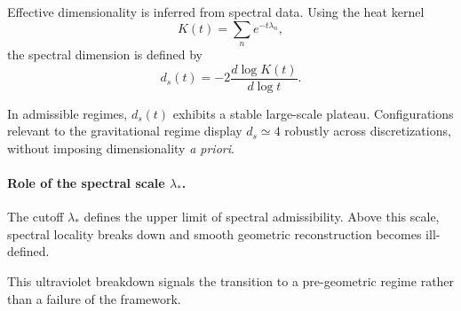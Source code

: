     Effective dimensionality is inferred from spectral data.
    Using the heat kernel
    \begin{equation}
      K(t) = \sum_n e^{-t \lambda_n},
    \end{equation}
    the spectral dimension is defined by
    \begin{equation}
      d_s(t) = -2 \frac{d \log K(t)}{d \log t}.
    \end{equation}

    In admissible regimes, $d_s(t)$ exhibits a stable large-scale plateau.
    Configurations relevant to the gravitational regime display
    $d_s \simeq 4$ robustly across discretizations,
    without imposing dimensionality \emph{a priori}.

  \paragraph{Role of the spectral scale $\lambda_*$.}

    The cutoff $\lambda_*$ defines the upper limit of spectral admissibility.
    Above this scale, spectral locality breaks down and smooth geometric
    reconstruction becomes ill-defined.

    This ultraviolet breakdown signals the transition to a
    pre-geometric regime rather than a failure of the framework.
